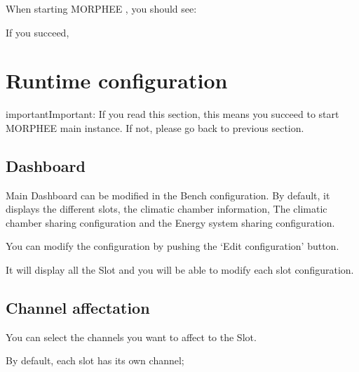 \documentclass[letterpaper,10pt,english]{jupyterBook}
\begin{document}
\sphinxAtStartPar
When starting MORPHEE , you should see:

\sphinxAtStartPar
If you succeed, 


\chapter{Runtime configuration}
\label{\detokenize{05_SCALE_Battery-configuration:runtime-configuration}}\label{\detokenize{05_SCALE_Battery-configuration::doc}}
\begin{sphinxadmonition}{important}{Important:}
\sphinxAtStartPar
If you read this section, this means you succeed to start MORPHEE main instance. If not, please go back to previous section.
\end{sphinxadmonition}


\section{Dashboard}
\label{\detokenize{05_SCALE_Battery-configuration:dashboard}}
\sphinxAtStartPar
Main Dashboard can be modified in the Bench configuration. By default, it displays the different slots, the climatic chamber information, The climatic chamber sharing configuration and the Energy system sharing configuration.

\sphinxAtStartPar
{}

\sphinxAtStartPar
You can modify the configuration by pushing the ‘Edit configuration’ button.

\sphinxAtStartPar
{}

\sphinxAtStartPar
It will display all the Slot and you will be able to modify each slot configuration.


\section{Channel affectation}
\label{\detokenize{05_SCALE_Battery-configuration:channel-affectation}}
\sphinxAtStartPar
You can select the channels you want to affect to the Slot.

\sphinxAtStartPar
{}

\sphinxAtStartPar
By default, each slot has its own channel;
\end{document}
